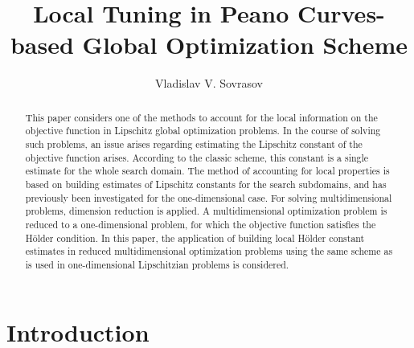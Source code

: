 \documentclass[procedia]{easychair}
\title{Local Tuning in Peano Curves-based Global Optimization Scheme}
\author{
    Vladislav V. Sovrasov%
}
\institute{
  State University of Nizhny Novgorod,
  Nizhny Novgorod, Russia\\
  \email{sovrasov.vlad@gmail.com}
 }
\begin{document}
\maketitle


\begin{abstract}
This paper considers one of the methods to account for the local information on the
objective function in  Lipschitz global optimization problems. In the course of solving
such problems, an issue arises regarding estimating the Lipschitz constant of the
objective function arises. According to the classic scheme, this constant is a single
estimate for the whole search domain. The method of accounting for local properties
is based on building estimates of Lipschitz constants for the search subdomains,
and has previously been investigated for the one-dimensional case. For solving
multidimensional problems, dimension reduction is applied. A multidimensional
optimization problem is reduced to a one-dimensional problem, for which the objective
function satisfies the Hölder condition. In this paper, the application of building
local Hölder constant estimates in reduced multidimensional optimization problems using
the same scheme as is used in one-dimensional Lipschitzian problems is considered.
\end{abstract}


%
%


\section{Introduction}
\label{sect:introduction}
\end{document}
